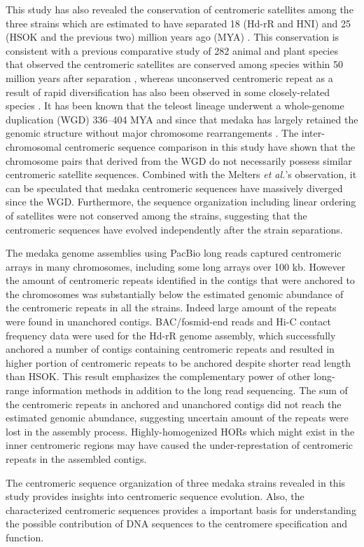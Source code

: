 This study has also revealed the conservation of centromeric satellites among the three strains which are estimated to have separated 18 (Hd-rR and HNI) and 25 (HSOK and the previous two) million years ago (MYA) \cite{Setiamarga2009}. This conservation is consistent with a previous comparative study of 282 animal and plant species that observed the centromeric satellites are conserved among species within 50 million years after separation \cite{Melters2013}, whereas unconserved centromeric repeat as a result of rapid diversification has also been observed in some closely-related species \cite{Lee2005}. It has been known that the teleost lineage underwent a whole-genome duplication (WGD) 336--404 MYA and since that medaka has largely retained the genomic structure without major chromosome rearrangements \cite{Kasahara2007}. The inter-chromosomal centromeric sequence comparison in this study have shown that the chromosome pairs that derived from the WGD do not necessarily possess similar centromeric satellite sequences. Combined with the Melters \textit{et al.}'s observation, it can be speculated that medaka centromeric sequences have massively diverged since the WGD. Furthermore, the sequence organization including linear ordering of satellites were not conserved among the strains, suggesting that the centromeric sequences have evolved independently after the strain separations.

The medaka genome assemblies using PacBio long reads captured centromeric arrays in many chromosomes, including some long arrays over 100 kb. However the amount of centromeric repeats identified in the contigs that were anchored to the chromosomes was substantially below the estimated genomic abundance of the centromeric repeats in all the strains. Indeed large amount of the repeats were found in unanchored contigs. BAC/fosmid-end reads and Hi-C contact frequency data were used for the Hd-rR genome assembly, which successfully anchored a number of contigs containing centromeric repeats and resulted in higher portion of centromeric repeats to be anchored despite shorter read length than HSOK. This result emphasizes the complementary power of other long-range information methods in addition to the long read sequencing. The sum of the centromeric repeats in anchored and unanchored contigs did not reach the estimated genomic abundance, suggesting uncertain amount of the repeats were lost in the assembly process. Highly-homogenized HORs which might exist in the inner centromeric regions may have caused the under-represtation of centromeric repeats in the assembled contigs.

The centromeric sequence organization of three medaka strains revealed in this study provides insights into centromeric sequence evolution. Also, the characterized centromeric sequences provides a important basis for understanding the possible contribution of DNA sequences to the centromere specification and function.
